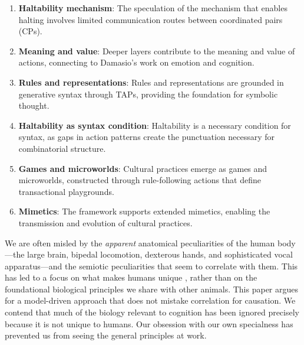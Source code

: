 \begin{enumerate}
    \item \textbf{Haltability mechanism}: The speculation of the mechanism that enables halting involves limited communication routes between coordinated pairs (CPs).
    
    \item \textbf{Meaning and value}: Deeper layers contribute to the meaning and value of actions, connecting to Damasio's work on emotion and cognition.
    
    \item \textbf{Rules and representations}: Rules and representations are grounded in generative syntax through TAPs, providing the foundation for symbolic thought.
    
    \item \textbf{Haltability as syntax condition}: Haltability is a necessary condition for syntax, as gaps in action patterns create the punctuation necessary for combinatorial structure.
    
    \item \textbf{Games and microworlds}: Cultural practices emerge as games and microworlds, constructed through rule-following actions that define transactional playgrounds.
    
    \item \textbf{Mimetics}: The framework supports extended mimetics, enabling the transmission and evolution of cultural practices.
\end{enumerate}

We are often misled by the \textit{apparent} anatomical peculiarities of the human body—the large brain, bipedal locomotion, dexterous hands, and sophisticated vocal apparatus—and the semiotic peculiarities that seem to correlate with them. This has led to a focus on what makes humans unique \cite{hauser2002uniquely}, rather than on the foundational biological principles we share with other animals. This paper argues for a model-driven approach that does not mistake correlation for causation. We contend that much of the biology relevant to cognition has been ignored precisely because it is not unique to humans. Our obsession with our own specialness has prevented us from seeing the general principles at work.

